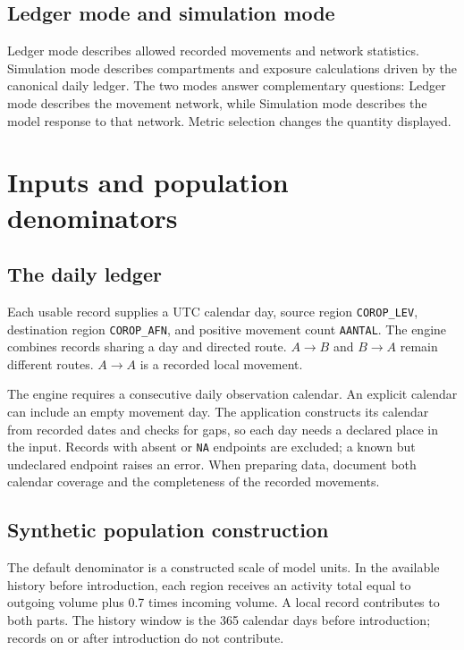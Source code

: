 \documentclass[11pt,a4paper]{article}
\begin{document}
\subsection{Ledger mode and simulation
mode}\label{ledger-mode-and-simulation-mode}

Ledger mode describes allowed recorded movements and network statistics.
Simulation mode describes compartments and exposure calculations driven
by the canonical daily ledger. The two modes answer complementary
questions: Ledger mode describes the movement network, while Simulation
mode describes the model response to that network. Metric selection
changes the quantity displayed.

\section{Inputs and population
denominators}\label{inputs-and-population-denominators}

\subsection{The daily ledger}\label{the-daily-ledger}

Each usable record supplies a UTC calendar day, source region
\nolinkurl{COROP_LEV}, destination region \nolinkurl{COROP_AFN}, and
positive movement count \nolinkurl{AANTAL}. The engine combines records
sharing a day and directed route. \(A \to  B\) and \(B \to  A\) remain
different routes. \(A \to  A\) is a recorded local movement.

The engine requires a consecutive daily observation calendar. An
explicit calendar can include an empty movement day. The application
constructs its calendar from recorded dates and checks for gaps, so each
day needs a declared place in the input. Records with absent or
\texttt{NA} endpoints are excluded; a known but undeclared endpoint
raises an error. When preparing data, document both calendar coverage
and the completeness of the recorded movements.

\subsection{Synthetic population
construction}\label{synthetic-population-construction}

The default denominator is a constructed scale of model units. In the
available history before introduction, each region receives an activity
total equal to outgoing volume plus 0.7 times incoming volume. A local
record contributes to both parts. The history window is the 365 calendar
days before introduction; records on or after introduction do not
contribute.
\end{document}
